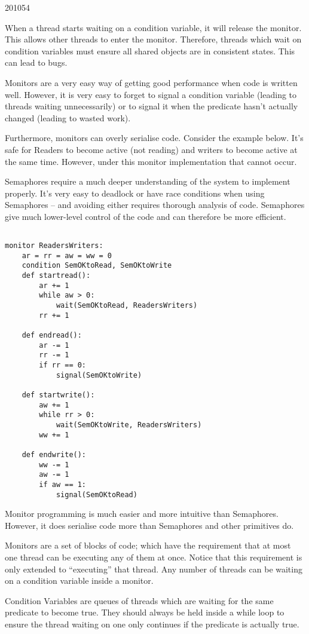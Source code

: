 \documentclass[10pt,\jkfside,a4paper]{article}
\begin{document}
\begin{examquestion}{2010}{5}{4}
\begin{enumerate}[label=(\alph*)]
When a thread starts waiting on a condition variable, it will release the
monitor. This allows other threads to enter the monitor. Therefore, threads
which wait on condition variables must ensure all shared objects are in
consistent states. This can lead to bugs.

Monitors are a very easy way of getting good performance when code is
written well. However, it is very easy to forget to signal a condition
variable (leading to threads waiting unnecessarily) or to signal it when the
predicate hasn't actually changed (leading to wasted work).

Furthermore, monitors can overly serialise code. Consider the example below.
It's safe for Readers to become active (not reading) and writers to become
active at the same time. However, under this monitor implementation that
cannot occur.

Semaphores require a much deeper understanding of the system to
implement properly. It's very easy to deadlock or have race conditions when
using Semaphores -- and avoiding either requires thorough analysis of code.
Semaphores give much lower-level control of the code and can therefore be
more efficient.

\begin{lstlisting}

monitor ReadersWriters:
	ar = rr = aw = ww = 0
	condition SemOKtoRead, SemOKtoWrite
	def startread():
		ar += 1
		while aw > 0:
			wait(SemOKtoRead, ReadersWriters)
		rr += 1

	def endread():
		ar -= 1
		rr -= 1
		if rr == 0:
			signal(SemOKtoWrite)

	def startwrite():
		aw += 1
		while rr > 0:
			wait(SemOKtoWrite, ReadersWriters)
		ww += 1

	def endwrite():
		ww -= 1
		aw -= 1
		if aw == 1:
			signal(SemOKtoRead)
\end{lstlisting}

\iffalse

Monitor programming is much easier and more intuitive than Semaphores.
However, it does serialise code more than Semaphores and other primitives do.

Monitors are a set of blocks of code; which have the requirement that at most
one thread can be executing any of them at once. Notice that this
requirement is only extended to ``executing'' that thread. Any number of
threads can be waiting on a condition variable inside a monitor.

Condition Variables are queues of threads which are waiting for the same
predicate to become true. They should always be held inside a while loop to
ensure the thread waiting on one only continues if the predicate is actually
true.


\end{enumerate}
\end{examquestion}
\end{document}
